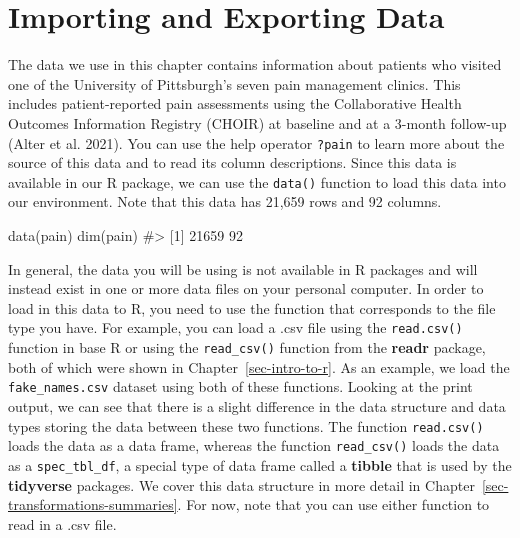 \documentclass[
  letterpaper,
]{latex/krantz}
\makeatletter
\newenvironment{Shaded}{\begin{snugshade}}{\end{snugshade}}
\newcommand{\CommentTok}[1]{\textcolor[rgb]{0.37,0.37,0.37}{#1}}
\newcommand{\FunctionTok}[1]{\textcolor[rgb]{0.28,0.35,0.67}{#1}}
\newcommand{\NormalTok}[1]{\textcolor[rgb]{0.00,0.23,0.31}{#1}}
\newenvironment{kframe}{%
\medskip{}
\setlength{\fboxsep}{.8em}
 \def\at@end@of@kframe{}%
 \ifinner\ifhmode%
  \def\at@end@of@kframe{\end{minipage}}%
  \begin{minipage}{\columnwidth}%
 \fi\fi%
 \def\FrameCommand##1{\hskip\@totalleftmargin \hskip-\fboxsep
 \colorbox{shadecolor}{##1}\hskip-\fboxsep
     \hskip-\linewidth \hskip-\@totalleftmargin \hskip\columnwidth}%
 \MakeFramed {\advance\hsize-\width
   \@totalleftmargin\z@ \linewidth\hsize
   \@setminipage}}%
 {\par\unskip\endMakeFramed%
 \at@end@of@kframe}
\renewenvironment{Shaded}{\begin{kframe}}{\end{kframe}}
\makeatother
\begin{document}
\section{\texorpdfstring{Importing and Exporting Data
}{Importing and Exporting Data  }}\label{importing-and-exporting-data}

The data we use in this chapter contains information about patients who
visited one of the University of Pittsburgh's seven pain management
clinics. This includes patient-reported pain assessments using the
Collaborative Health Outcomes Information Registry (CHOIR) at baseline
and at a 3-month follow-up (Alter et al. 2021). You can use the help
operator \texttt{?pain} to learn more about the source of this data and
to read its column descriptions.
Since this data is available in our R package, we can use the
\texttt{data()} function to
load this data into our environment. Note that this data has 21,659 rows
and 92 columns.

\begin{Shaded}
\begin{Highlighting}[]
\FunctionTok{data}\NormalTok{(pain)}
\FunctionTok{dim}\NormalTok{(pain)}
\CommentTok{\#\textgreater{} [1] 21659    92}
\end{Highlighting}
\end{Shaded}

In general, the data you will be using is not available in R packages
and will instead exist in one or more data files on your personal
computer. In order to load in this data to R, you need to use the
function that corresponds to the file type you have. For example, you
can load a .csv file  using the
\texttt{read.csv()}
function in base R or using the
\texttt{read\_csv()}
function from the \textbf{readr} package, both
of which were shown in Chapter~\ref{sec-intro-to-r}. As an example, we
load the \texttt{fake\_names.csv} dataset using both of these functions.
Looking at the print output, we can see that there is a slight
difference in the data structure and data types storing the data between
these two functions. The function \texttt{read.csv()} loads the data as
a data frame, whereas the function \texttt{read\_csv()} loads the data
as a \texttt{spec\_tbl\_df}, a special type of data frame called a
\textbf{tibble} that is used by the \textbf{tidyverse}
packages. We cover this data structure in
more detail in Chapter~\ref{sec-transformations-summaries}. For now,
note that you can use either function to read in a .csv file.
\end{document}
